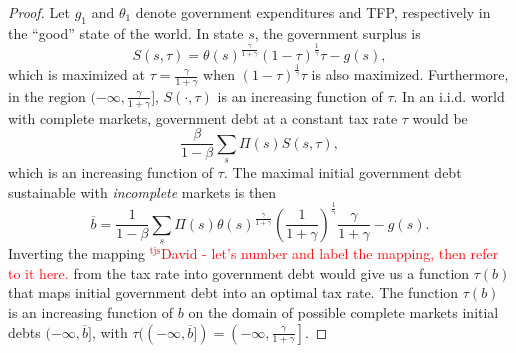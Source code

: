 \documentclass[12pt]{article}
\newcommand{\tjs}[1]{\textcolor{red}{$^{\textrm{tjs}}${#1}}}
\begin{document}
\begin{proof}  Let $g_1$ and $\theta_1$ denote  government expenditures and TFP, respectively in the ``good'' state of the world.
 In state $s$, the government surplus is
\[
	S(s,\tau) = \theta(s)^\frac\gamma{1+\gamma}(1-\tau)^\frac1\gamma\tau - g(s),
\]  which  is  maximized at $\tau = \frac\gamma{1+\gamma}$ when $(1-\tau)^\frac1\gamma\tau$ is also maximized. Furthermore, in the region $(-\infty,\frac\gamma{1+\gamma}]$, $S(\cdot,\tau)$ is an increasing function of $\tau$.  In an i.i.d. world with complete markets, government debt
at a constant tax rate $\tau$ would be
\[
	\frac\beta{1-\beta} \sum_s \Pi(s) S(s,\tau),
\] which is an increasing function of $\tau$.  The maximal initial government debt sustainable with {\em incomplete} markets is then
\[
	\overline b = \frac1{1-\beta} \sum_s \Pi(s)\theta(s)^\frac\gamma{1+\gamma}\left(\frac{1}{1+\gamma}\right)^\frac1\gamma\frac{\gamma}{1+\gamma} - g(s) .\] Inverting the mapping \tjs{David - let's number and label the mapping, then refer to it here.}  from the tax rate into government debt would give us a  function $\tau(b)$ that maps initial government debt into an optimal tax rate. The function $\tau(b)$ is an increasing function of $b$ on the domain of possible complete markets initial debts $(-\infty,\overline b]$, with $\tau((-\infty,\overline{b}]) = \left(-\infty,\frac\gamma{1+\gamma}\right]$.



\end{proof}
\end{document}
